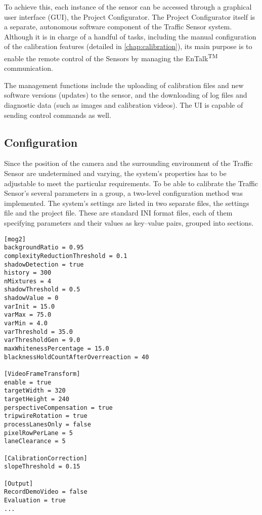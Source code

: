 To achieve this, each instance of the sensor can be accessed through a graphical user interface (GUI), the Project Configurator.
The Project Configurator itself is a separate, autonomous software component of the Traffic Sensor system.
Although it is in charge of a handful of tasks, including the manual configuration of the calibration features (detailed in \ref{chap:calibration}), its main purpose is to enable the remote control of the Sensors by managing the EnTalk\textsuperscript{TM} communication.

The management functions include the uploading of calibration files and new software versions (updates) to the sensor, and the downloading of log files and diagnostic data (such as images and calibration videos).
The UI is capable of sending control commands as well.
\subsection{Configuration}\label{subs:ProjectConfigurator}
Since the position of the camera and the surrounding environment of the Traffic Sensor are undetermined and varying, the system's properties has to be adjustable to meet the particular requirements.
To be able to calibrate the Traffic Sensor's several parameters in a group, a two-level configuration method was implemented.
The system's settings are listed in two separate files, the settings file and the project file.
These are standard INI format files, each of them specifying parameters and their values as key--value pairs, grouped into sections.

\begin{lstlisting}[frame=single,float=!ht,caption={Part of a configuration file. The features are rganized into groups, and presented as key--value pairs.},label=lst:config_file]
[mog2]
backgroundRatio = 0.95
complexityReductionThreshold = 0.1
shadowDetection = true
history = 300
nMixtures = 4
shadowThreshold = 0.5
shadowValue = 0
varInit = 15.0
varMax = 75.0
varMin = 4.0
varThreshold = 35.0
varThresholdGen = 9.0
maxWhitenessPercentage = 15.0
blacknessHoldCountAfterOverreaction = 40

[VideoFrameTransform]
enable = true
targetWidth = 320
targetHeight = 240
perspectiveCompensation = true
tripwireRotation = true
processLanesOnly = false
pixelRowPerLane = 5
laneClearance = 5

[CalibrationCorrection]
slopeThreshold = 0.15

[Output]
RecordDemoVideo = false
Evaluation = true
...
\end{lstlisting}


